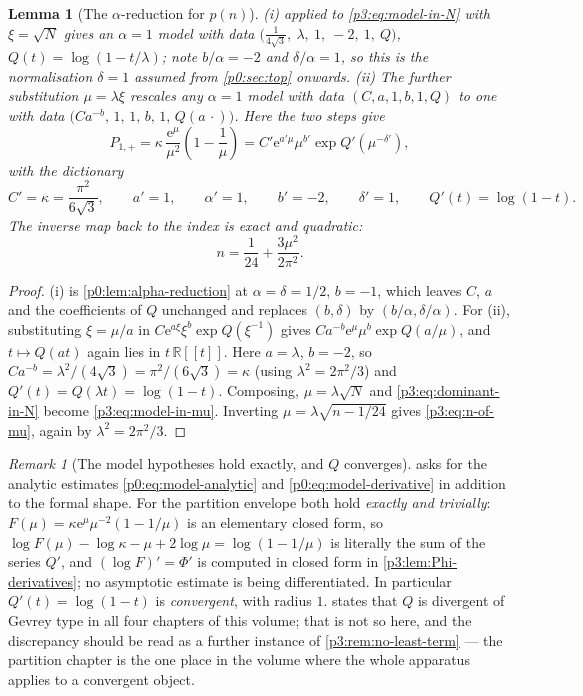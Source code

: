 \documentclass[11pt,a4paper,oneside]{book}
\theoremstyle{plain}
\newtheorem{lemma}[theorem]{Lemma}
\theoremstyle{definition}
\theoremstyle{remark}
\newtheorem{remark}[theorem]{Remark}
\newcommand{\Real}{\mathbb{R}}
\newcommand{\e}{\mathrm{e}}
\begin{document}
\begin{lemma}[The $\alpha$-reduction for $p(n)$]\label{p3:lem:alpha-reduction}
\emph{(i)}  applied to \cref{p3:eq:model-in-N} with
$\xi=\sqrt N$ gives an $\alpha=1$ model with data
$\bigl(\tfrac1{4\sqrt3},\ \lambda,\ 1,\ -2,\ 1,\ Q\bigr)$, $Q(t)=\log(1-t/\lambda)$; note
$b/\alpha=-2$ and $\delta/\alpha=1$, so this is the normalisation $\delta=1$ assumed from
\cref{p0:sec:top} onwards.  \emph{(ii)} The further substitution $\mu=\lambda\xi$ rescales any
$\alpha=1$ model with data $(C,a,1,b,1,Q)$ to one with data
$\bigl(Ca^{-b},\,1,\,1,\,b,\,1,\,Q(a\,\cdot)\bigr)$.  Here the two steps give
\begin{equation}\label{p3:eq:model-in-mu}
 P_{1,+}=\kappa\,\frac{\e^{\mu}}{\mu^{2}}\left(1-\frac1\mu\right)
 =C'\e^{a'\mu}\mu^{b'}\exp Q'(\mu^{-\delta'}),
\end{equation}
with the dictionary
\[
C'=\kappa=\frac{\pi^{2}}{6\sqrt3},\qquad a'=1,\qquad \alpha'=1,\qquad b'=-2,\qquad
\delta'=1,\qquad Q'(t)=\log(1-t).
\]
The inverse map back to the index is exact and quadratic:
\begin{equation}\label{p3:eq:n-of-mu}
 n=\frac1{24}+\frac{3\mu^{2}}{2\pi^{2}} .
\end{equation}
\end{lemma}

\begin{proof}
(i) is \cref{p0:lem:alpha-reduction} at $\alpha=\delta=1/2$, $b=-1$, which leaves $C$, $a$ and
the coefficients of $Q$ unchanged and replaces $(b,\delta)$ by $(b/\alpha,\delta/\alpha)$.
For (ii), substituting $\xi=\mu/a$ in $C\e^{a\xi}\xi^{b}\exp Q(\xi^{-1})$ gives
$Ca^{-b}\e^{\mu}\mu^{b}\exp Q(a/\mu)$, and $t\mapsto Q(at)$ again lies in $t\,\Real[[t]]$.
Here $a=\lambda$, $b=-2$, so $Ca^{-b}=\lambda^{2}/(4\sqrt3)=\pi^{2}/(6\sqrt3)=\kappa$ (using
$\lambda^{2}=2\pi^{2}/3$) and $Q'(t)=Q(\lambda t)=\log(1-t)$.  Composing, $\mu=\lambda\sqrt N$
and \cref{p3:eq:dominant-in-N} become \cref{p3:eq:model-in-mu}.  Inverting
$\mu=\lambda\sqrt{n-1/24}$ gives \cref{p3:eq:n-of-mu}, again by $\lambda^{2}=2\pi^{2}/3$.
\end{proof}

\begin{remark}[The model hypotheses hold exactly, and $Q$ converges]
\label{p3:rem:model-exact}
 asks for the analytic estimates \cref{p0:eq:model-analytic} and
\cref{p0:eq:model-derivative} in addition to the formal shape.  For the partition envelope both
hold \emph{exactly and trivially}: $F(\mu)=\kappa\e^{\mu}\mu^{-2}(1-1/\mu)$ is an elementary
closed form, so $\log F(\mu)-\log\kappa-\mu+2\log\mu=\log(1-1/\mu)$ is literally the sum of the
series $Q'$, and $(\log F)'=\Phi'$ is computed in closed form in
\cref{p3:lem:Phi-derivatives}; no asymptotic estimate is being differentiated.  In particular
$Q'(t)=\log(1-t)$ is \emph{convergent}, with radius $1$.   states
that $Q$ is divergent of Gevrey type in all four chapters of this volume; that is not so here,
and the discrepancy should be read as a further instance of
\cref{p3:rem:no-least-term} --- the partition chapter is the one place in the volume where the
whole apparatus applies to a convergent object.
\end{remark}
\end{document}
